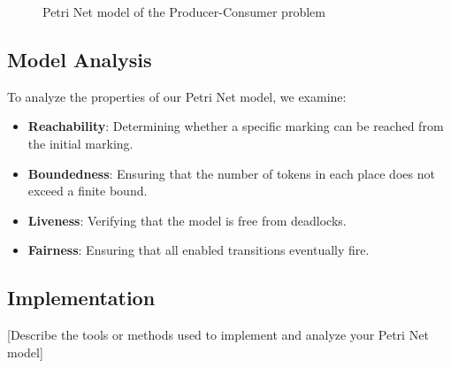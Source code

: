 \begin{figure}[htbp]
\centering

\caption{Petri Net model of the Producer-Consumer problem}
\label{fig:producer_consumer}
\end{figure}

\subsection{Model Analysis}

To analyze the properties of our Petri Net model, we examine:

\begin{itemize}
    \item \textbf{Reachability}: Determining whether a specific marking can be reached from the initial marking.
    \item \textbf{Boundedness}: Ensuring that the number of tokens in each place does not exceed a finite bound.
    \item \textbf{Liveness}: Verifying that the model is free from deadlocks.
    \item \textbf{Fairness}: Ensuring that all enabled transitions eventually fire.
\end{itemize}

\subsection{Implementation}

[Describe the tools or methods used to implement and analyze your Petri Net model]